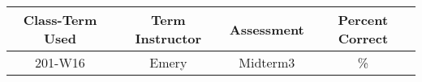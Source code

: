 \begin{outcomes}
	\begin{center}
		\begin{tabular}{cccc}
			\hline\hline
			Class-Term Used & Term Instructor & Assessment & Percent Correct\\
			\hline
			201-W16 & Emery & Midterm3 & \%\\    %
			\hline
		\end{tabular}
	\end{center}
\end{outcomes}

\begin{comments}
	
\end{comments}

